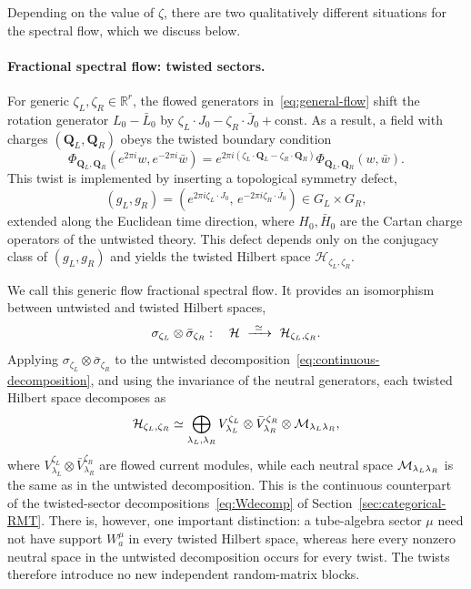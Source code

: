 \documentclass[11pt]{article}
\numberwithin{equation}{section}
\begin{document}
Depending on the value of $\zeta$, there are two qualitatively different situations for the spectral flow,
which we discuss below.



 \paragraph{Fractional spectral flow: twisted sectors.}
For generic $\zeta_L,\zeta_R\in\mathbb{R}^r$, the flowed generators in~\eqref{eq:general-flow} shift the rotation generator $L_0-\bar L_0$ by $\zeta_L\cdot J_0-\zeta_R\cdot\bar J_0+\text{const}$. As a result, a field with charges $(\mathbf Q_L,\mathbf Q_R)$ obeys the twisted boundary condition
\begin{equation}
  \Phi_{\mathbf Q_L,\mathbf Q_R}(e^{2\pi i}w,e^{-2\pi i}\bar w)
  =e^{2\pi i(\zeta_L\cdot\mathbf Q_L-\zeta_R\cdot\mathbf Q_R)}
   \Phi_{\mathbf Q_L,\mathbf Q_R}(w,\bar w).
  \label{eq:twisted-bc}
\end{equation}
This twist is implemented by inserting a topological symmetry defect,
\begin{equation}
  (g_L,g_R)
  =\left(e^{2\pi i\zeta_L\cdot J_0},\,e^{-2\pi i\zeta_R\cdot\bar J_0}\right)
  \in G_L\times G_R,
  \label{eq:defect}
\end{equation}
extended along the Euclidean time direction, where $H_0,\bar H_0$ are the Cartan charge
operators of the untwisted theory. This defect depends only on the conjugacy class of
$(g_L,g_R)$ and yields the twisted Hilbert space
$\mathcal{H}_{\zeta_L,\zeta_R}$.

We call this generic flow fractional spectral flow. It provides an isomorphism between untwisted and twisted Hilbert spaces,
\begin{equation}
\sigma_{\zeta_L}\otimes\bar\sigma_{\zeta_R}:\quad
 \mathcal H\ \xrightarrow{\ \simeq\ }\ \mathcal H_{\zeta_L,\zeta_R}.
\label{eq:flow-isomorphism}
\end{equation}
Applying $\sigma_{\zeta_L}\otimes\bar\sigma_{\zeta_R}$ to the untwisted decomposition~\eqref{eq:continuous-decomposition}, and using the invariance of the neutral generators, each twisted Hilbert space decomposes as
\begin{equation}
\mathcal H_{\zeta_L,\zeta_R}
 \simeq\bigoplus_{\lambda_L,\lambda_R}
 V^{\zeta_L}_{\lambda_L}\otimes
 \bar V^{\zeta_R}_{\lambda_R}\otimes
 \mathcal{M}_{\lambda_L\lambda_R},
\label{eq:twisted-decomposition}
\end{equation}
where $V^{\zeta_L}_{\lambda_L}\otimes
 \bar V^{\zeta_R}_{\lambda_R}$ are flowed current modules, while each neutral space $\mathcal{M}_{\lambda_L\lambda_R}$ is the same as in the untwisted decomposition. This is the continuous counterpart of the twisted-sector decompositions~\eqref{eq:Wdecomp} of Section~\ref{sec:categorical-RMT}. There is, however, one important distinction: a tube-algebra sector $\mu$ need not have support $W_a^\mu$ in every twisted Hilbert space, whereas here every nonzero neutral space in the untwisted decomposition occurs for every twist. The twists therefore introduce no new independent random-matrix blocks.
 
\end{document}
